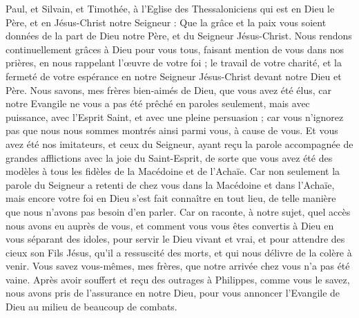 \begin{multicols}{2}
\TextTitle{[Introduction]}
\VerseOne{}Paul, et Silvain, et Timothée, à l'Eglise des Thessaloniciens qui est en Dieu le Père, et en Jésus-Christ notre Seigneur : Que la grâce et la paix vous soient données de la part de Dieu notre Père, et du Seigneur Jésus-Christ.
Nous rendons continuellement grâces à Dieu pour vous tous, faisant mention de vous dans nos prières,
en nous rappelant l’œuvre de votre foi ; le travail de votre charité, et la fermeté de votre espérance en notre Seigneur Jésus-Christ devant notre Dieu et Père.
Nous savons, mes frères bien-aimés de Dieu, que vous avez été élus,
car notre Evangile ne vous a pas été prêché en paroles seulement, mais avec puissance, avec l’Esprit Saint, et avec une pleine persuasion ; car vous n’ignorez pas que nous nous sommes montrés ainsi parmi vous, à cause de vous.
Et vous avez été nos imitateurs, et ceux du Seigneur, ayant reçu la parole accompagnée de grandes afflictions avec la joie du Saint-Esprit,
de sorte que vous avez été des modèles à tous les fidèles de la Macédoine et de l’Achaïe.
Car non seulement la parole du Seigneur a retenti de chez vous dans la Macédoine et dans l'Achaïe, mais encore votre foi en Dieu s’est fait connaître en tout lieu, de telle manière que nous n’avons pas besoin d’en parler.
Car on raconte, à notre sujet, quel accès nous avons eu auprès de vous, et comment vous vous êtes convertis à Dieu en vous séparant des idoles, pour servir le Dieu vivant et vrai,
et pour attendre des cieux son Fils Jésus, qu'il a ressuscité des morts, et qui nous délivre de la colère à venir.
\VerseOne{}Vous savez vous-mêmes, mes frères, que notre arrivée chez vous n'a pas été vaine.
Après avoir souffert et reçu des outrages à Philippes, comme vous le savez, nous avons pris de l’assurance en notre Dieu, pour vous annoncer l’Evangile de Dieu au milieu de beaucoup de combats.

\end{multicols}
